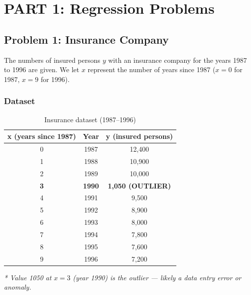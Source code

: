 \documentclass[12pt,a4paper]{article}
\begin{document}
\section*{PART 1: Regression Problems}
\renewcommand{\thesubsection}{1.\arabic{subsection}}
\renewcommand{\thesubsubsection}{\thesubsection.\arabic{subsubsection}}
\setcounter{subsection}{0}
\setcounter{subsubsection}{0}

\subsection{Problem 1: Insurance Company}

The numbers of insured persons $y$ with an insurance company for the years 1987 to 1996
are given. We let $x$ represent the number of years since 1987 ($x=0$ for 1987,
$x=9$ for 1996).

\subsubsection{Dataset}

\begin{table}[H]
\centering
\begin{tabular}{ccc}
\toprule
\textbf{x (years since 1987)} & \textbf{Year} & \textbf{y (insured persons)} \\
\midrule
0  & 1987 & 12,400 \\
1  & 1988 & 10,900 \\
2  & 1989 & 10,000 \\
\textbf{3}  & \textbf{1990} & \textbf{1,050 (OUTLIER)} \\
4  & 1991 & 9,500  \\
5  & 1992 & 8,900  \\
6  & 1993 & 8,000  \\
7  & 1994 & 7,800  \\
8  & 1995 & 7,600  \\
9  & 1996 & 7,200  \\
\bottomrule
\end{tabular}
\caption{Insurance dataset (1987--1996)}
\end{table}

\textit{* Value 1050 at $x=3$ (year 1990) is the outlier --- likely a data entry error or anomaly.}
\end{document}
